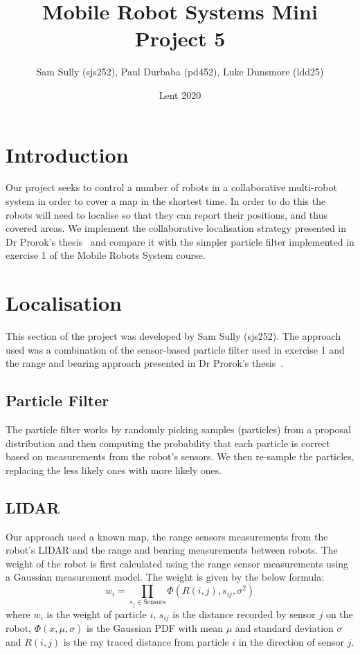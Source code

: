 \documentclass[10pt,a4paper]{article}
\begin{document}
\twocolumn
\title{Mobile Robot Systems Mini Project 5}
\author{Sam Sully (sjs252), Paul Durbaba (pd452), Luke Dunsmore (ldd25)}
\date{Lent 2020}
\maketitle
\section{Introduction}
Our project seeks to control a number of robots in a collaborative multi-robot system in order to cover a map in the shortest time. In order to do this the robots will need to localise so that they can report their positions, and thus covered areas. We implement the collaborative localisation strategy presented in Dr Prorok's thesis~\cite{prorok} and compare it with the simpler particle filter implemented in exercise 1 of the Mobile Robots System course.
\section{Localisation}
This section of the project was developed by Sam Sully (sjs252). The approach used was a combination of the sensor-based particle filter used in exercise 1 and the range and bearing approach presented in Dr Prorok's thesis~\cite{prorok}.
\subsection{Particle Filter}
The particle filter works by randomly picking samples (particles) from a proposal distribution and then computing the probability that each particle is correct based on measurements from the robot's sensors. We then re-sample the particles, replacing the less likely ones with more likely ones.
\subsection{LIDAR}
Our approach used a known map, the range sensors measurements from the robot's LIDAR and the range and bearing measurements between robots. The weight of the robot is first calculated using the range sensor measurements using a Gaussian measurement model. The weight is given by the below formula:
\[
	w_i = \prod_{s_{j} \in \mathrm{Sensors}}\Phi(R(i,j), s_{ij}, \sigma^2)
\]
where $w_i$ is the weight of particle $i$, $s_{ij}$ is the distance recorded by sensor $j$ on the robot, $\Phi(x,\mu,\sigma)$ is the Gaussian PDF with mean $\mu$ and standard deviation $\sigma$ and $R(i,j)$ is the ray traced distance from particle $i$ in the direction of sensor $j$.
\end{document}
